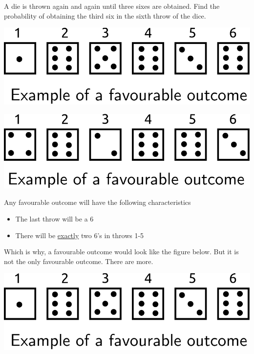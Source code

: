 \documentclass[14pt,fleqn]{extarticle}
\begin{document}
A die is thrown again and again until three 
sixes are obtained. Find the probability of 
obtaining the third six in the sixth throw 
of the dice.
%

\newcard

\begin{center}
\includegraphics[scale=0.7]{right.svg} 
\end{center} 

\newcard

\begin{center}
\includegraphics[scale=0.7]{wrong.svg}
\end{center} 

\newcard

Any favourable outcome will have the following characteristics 

\begin{itemize}
\item{The last throw will be a 6} 
\item{There will be \underline{exactly} two 6's in throws 1-5} 
\end{itemize} 

Which is why, a favourable outcome would look like the figure below. 
But it is not the only favourable outcome. There are more. 

\begin{center}
\includegraphics[scale=0.7]{right.svg}  
\end{center} 
\end{document}
